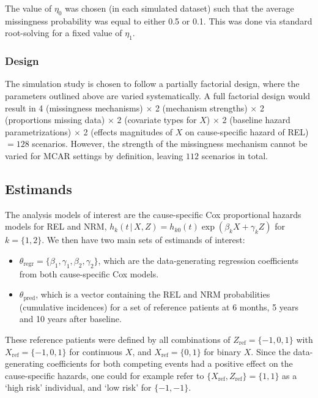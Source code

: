 \documentclass[
  letterpaper,
  paper=240mm:170mm,
  twoside=true,
  open=right,
  fontsize=10pt,
  pagesize=false,
  BCOR=15mm,
  DIV=14,
  headinclude=true,
  footinclude=false,
  headsepline=on]{scrbook}
\newcommand{\given}{\,|\,}
\begin{document}
The value of \(\eta_0\) was chosen (in each simulated dataset) such that
the average missingness probability was equal to either 0.5 or 0.1. This
was done via standard root-solving for a fixed value of \(\eta_1\).

\subsubsection{Design}\label{design}

The simulation study is chosen to follow a partially factorial design,
where the parameters outlined above are varied systematically. A full
factorial design would result in 4 (missingness mechanisms) \(\times\) 2
(mechanism strengths) \(\times\) 2 (proportions missing data) \(\times\)
2 (covariate types for \(X\)) \(\times\) 2 (baseline hazard
parametrizations) \(\times\) 2 (effects magnitudes of \(X\) on
cause-specific hazard of REL) \(= 128\) scenarios. However, the strength
of the missingness mechanism cannot be varied for MCAR settings by
definition, leaving \(112\) scenarios in total.

\subsection{Estimands}\label{estimands}

The analysis models of interest are the cause-specific Cox proportional
hazards models for REL and NRM,
\(h_k(t \given X, Z) = h_{k0}(t)\exp(\beta_k X + \gamma_k Z)\) for
\(k = \{1,2\}\). We then have two main sets of estimands of interest:

\begin{itemize}
\item
  \(\theta_{\text{regr}} = \{\beta_1,\gamma_1,\beta_2,\gamma_2\}\),
  which are the data-generating regression coefficients from both
  cause-specific Cox models.
\item
  \(\theta_{\text{pred}}\), which is a vector containing the REL and NRM
  probabilities (cumulative incidences) for a set of reference patients
  at 6 months, 5 years and 10 years after baseline.
\end{itemize}

These reference patients were defined by all combinations of
\(Z_{\text{ref}} = \{-1,0,1\}\) with \(X_{\text{ref}} = \{-1,0,1\}\) for
continuous \(X\), and \(X_{\text{ref}} = \{0,1\}\) for binary \(X\).
Since the data-generating coefficients for both competing events had a
positive effect on the cause-specific hazards, one could for example
refer to \(\{X_{\text{ref}},Z_{\text{ref}}\} = \{1, 1\}\) as a `high
risk' individual, and `low risk' for \(\{-1, -1\}\).
\end{document}
